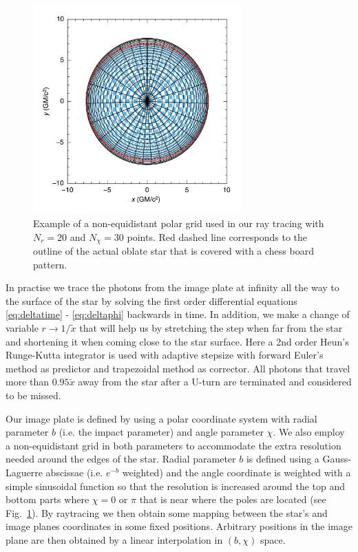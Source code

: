 \documentclass[iop, usenatbib]{emulateapj}
\begin{document}
\begin{figure}
\centering
\includegraphics[width=8cm]{figs/fig6a.pdf}
\caption{\label{fig:grid}
Example of a non-equidistant polar grid used in our ray tracing with $N_r = 20$ and $N_{\chi} = 30$ points.
Red dashed line corresponds to the outline of the actual oblate star that is covered with a chess board pattern.
}
\end{figure}


In practise we trace the photons from the image plate at infinity all the way to the surface of the star by solving the first order differential equations \eqref{eq:deltatime} - \eqref{eq:deltaphi} backwards in time.
In addition, we make a change of variable $r \rightarrow 1/\tilde{x}$ that will help us by stretching the step when far from the star and shortening it when coming close to the star surface.
Here a 2nd order Heun's Runge-Kutta integrator is used with adaptive stepsize with forward Euler's method as predictor and trapezoidal method as corrector.
All photons that travel more than $0.95\tilde{x}$ away from the star after a U-turn are terminated and considered to be missed.

Our image plate is defined by using a polar coordinate system with radial parameter $b$ (i.e. the impact parameter) and angle parameter $\chi$.
We also employ a non-equidistant grid in both parameters to accommodate the extra resolution needed around the edges of the star.
Radial parameter $b$ is defined using a Gauss-Laguerre abscissae (i.e. $e^{-b}$ weighted) and the angle coordinate is weighted with a simple sinusoidal function so that the resolution is increased around the top and bottom parts where $\chi = 0$ or $\pi$ that is near where the poles are located (see Fig.~\ref{fig:grid}).
By raytracing we then obtain some mapping between the star's and image planes coordinates in some fixed positions.
Arbitrary positions in the image plane are then obtained by a linear interpolation in $(b, \chi)$ space.
\end{document}
